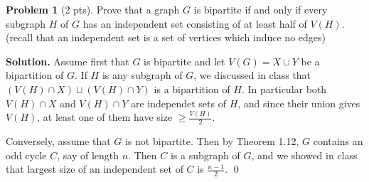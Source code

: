 \documentclass[11pt]{scrartcl}
\theoremstyle{definition}
\newtheorem{problem}{Problem}
\newenvironment{solution}{\noindent\textbf{Solution.}}{\qed}
\begin{document}
\hrulefill
\begin{problem}[2 pts]
Prove that a graph $G$ is bipartite if and only if every subgraph $H$ of $G$ has an independent set consisting of at least half of $V(H)$.
(recall that an independent set is a set of vertices which induce no edges)
\end{problem}

\begin{solution}
Assume first that $G$ is bipartite and let $V(G)=X\sqcup Y$ be a bipartition of $G$. If $H$ is any subgraph of $G$, we discussed in class that $(V(H)\cap X) \sqcup(V(H)\cap Y)$ is a bipartition of $H$. In particular both $V(H)\cap X$ and $V(H)\cap Y$ are independet sets of $H$, and since their union gives $V(H)$, at least one of them have size $\geq \frac{V(H)}{2}$. 

Conversely, assume that $G$ is not bipartite. Then by Theorem 1.12, $G$ contains an odd cycle $C$, say of length $n$. Then $C$ is a subgraph of $G$, and we showed in class that largest size of an independent set of $C$ is $\frac{n-1}{2}$.
\end{solution}
\end{document}
